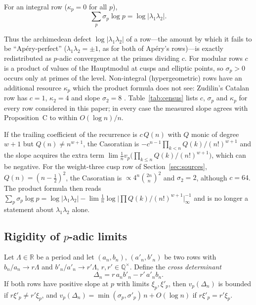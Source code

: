 \begin{corollary}\label{cor:product}
For an integral row ($\kappa_p=0$ for all $p$),
\[
\sum_p\sigma_p\log p=\log|\lambda_1\lambda_2|.
\]
\end{corollary}

Thus the archimedean defect $\log|\lambda_1\lambda_2|$ of a row---the amount by which it fails to be ``Ap\'ery-perfect'' ($\lambda_1\lambda_2=\pm1$, as for both of Ap\'ery's rows)---is exactly redistributed as $p$-adic convergence at the primes dividing $c$. For modular rows $c$ is a product of values of the Hauptmodul at cusps and elliptic points, so $\sigma_p>0$ occurs only at primes of the level. Non-integral (hypergeometric) rows have an additional resource $\kappa_p$ which the product formula does not see: Zudilin's Catalan row has $c=1$, $\kappa_2=4$ and slope $\sigma_2=8$ \cite{Zud02a}. Table~\ref{tab:census} lists $c$, $\sigma_p$ and $\kappa_p$ for every row considered in this paper; in every case the measured slope agrees with Proposition~C to within $O(\log n)/n$.

\begin{remark}\label{rem:nonzagier}
If the trailing coefficient of the recurrence is $c\,Q(n)$ with $Q$ monic of degree $w+1$ but $Q(n)\ne n^{w+1}$, the Casoratian is $-c^{n-1}\prod_{k<n}Q(k)/(n!)^{w+1}$ and the slope acquires the extra term $\lim\frac1n v_p\bigl(\prod_{k\le n}Q(k)/(n!)^{w+1}\bigr)$, which can be negative. For the weight-three cusp row of Section~\ref{sec:sources}, $Q(n)=(n-\tfrac12)^2$, the Casoratian is $\propto4^n\binom{2n}{n}^2$ and $\sigma_2=2$, although $c=64$. The product formula then reads $\sum_p\sigma_p\log p=\log|\lambda_1\lambda_2|-\lim\frac1n\log\bigl|\prod Q(k)/(n!)^{w+1}\bigr|_{\infty}^{-1}$ and is no longer a statement about $\lambda_1\lambda_2$ alone.
\end{remark}

\subsection{Rigidity of $p$-adic limits}

Let $\Lambda\in\mathbb R$ be a period and let $(a_n,b_n)$, $(a'_n,b'_n)$ be two rows with $b_n/a_n\to r\Lambda$ and $b'_n/a'_n\to r'\Lambda$, $r,r'\in\mathbb Q^\times$. Define the \emph{cross determinant}
\[
\Delta_n=r\,a_nb'_n-r'\,a'_nb_n .
\]
If both rows have positive slope at $p$ with limits $\xi_p,\xi'_p$, then $v_p(\Delta_n)$ is bounded if $r\xi'_p\ne r'\xi_p$, and $v_p(\Delta_n)=\min(\sigma_p,\sigma'_p)\,n+O(\log n)$ if $r\xi'_p=r'\xi_p$.

